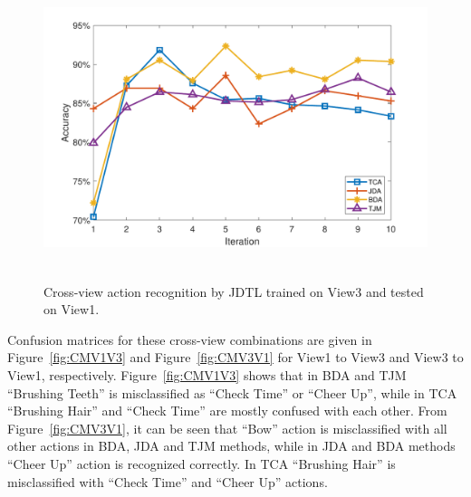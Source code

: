 \begin{figure}[hbt!]
	\centering
	\includegraphics[width=5in,height=3.5in]{figures/plots/View3-View1}
	\linebreak
	\caption{Cross-view action recognition by JDTL trained on View3 and tested on View1.}
	\label{fig1:View3-View1}
\end{figure}

Confusion matrices for these cross-view combinations are given in Figure~\ref{fig:CMV1V3} and Figure~\ref{fig:CMV3V1} for View1 to View3 and View3 to View1, respectively. Figure~\ref{fig:CMV1V3} shows that in BDA and TJM \enquote{Brushing Teeth} is misclassified as \enquote{Check Time} or \enquote{Cheer Up}, while in TCA \enquote{Brushing Hair} and \enquote{Check Time} are mostly confused with each other. From Figure~\ref{fig:CMV3V1}, it can be seen that \enquote{Bow} action is misclassified with all other actions in BDA, JDA and TJM methods, while in JDA and BDA methods \enquote{Cheer Up} action is recognized correctly. In TCA \enquote{Brushing Hair} is misclassified with \enquote{Check Time} and \enquote{Cheer Up} actions.





